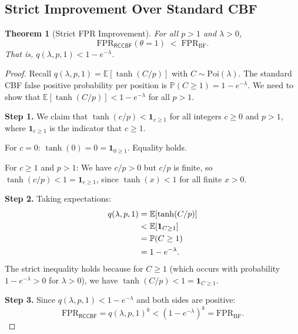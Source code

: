\documentclass[11pt,a4paper]{article}
\newtheorem{theorem}{Theorem}[section]
\newcommand{\RCCBF}{\textsf{RCCBF}}
\newcommand{\FPR}{\mathrm{FPR}}
\newcommand{\Poi}{\mathrm{Poi}}
\newcommand{\E}{\mathbb{E}}
\newcommand{\Prob}{\mathbb{P}}
\begin{document}
\subsection{Strict Improvement Over Standard CBF}\label{ssec:fpr-strict}

\begin{theorem}[Strict FPR Improvement]\label{thm:fpr-strict}
For all $p > 1$ and $\lambda > 0$,
\begin{equation}\label{eq:fpr-strict}
  \FPR_{\RCCBF}(\theta = 1) \;<\; \FPR_{\mathrm{BF}}.
\end{equation}
That is, $q(\lambda, p, 1) < 1 - e^{-\lambda}$.
\end{theorem}

\begin{proof}
Recall $q(\lambda, p, 1) = \E[\tanh(C/p)]$ with $C \sim \Poi(\lambda)$.
The standard CBF false positive probability per position is
$\Prob(C \ge 1) = 1 - e^{-\lambda}$.  We need to show that
$\E[\tanh(C/p)] < 1 - e^{-\lambda}$ for all $p > 1$.

\medskip\noindent\textbf{Step 1.}
We claim that $\tanh(c/p) < \mathbf{1}_{c \ge 1}$ for all integers
$c \ge 0$ and $p > 1$, where $\mathbf{1}_{c \ge 1}$ is the indicator that
$c \ge 1$.

For $c = 0$: $\tanh(0) = 0 = \mathbf{1}_{0 \ge 1}$.  Equality holds.

For $c \ge 1$ and $p > 1$: We have $c/p > 0$ but $c/p$ is finite, so
$\tanh(c/p) < 1 = \mathbf{1}_{c \ge 1}$, since $\tanh(x) < 1$ for all
finite $x > 0$.

\medskip\noindent\textbf{Step 2.}
Taking expectations:
\begin{align}
  q(\lambda, p, 1)
  &= \E[\tanh(C/p)] \notag \\
  &< \E[\mathbf{1}_{C \ge 1}] \notag \\
  &= \Prob(C \ge 1) \notag \\
  &= 1 - e^{-\lambda}.
  \label{eq:strict-ineq}
\end{align}
The strict inequality holds because for $C \ge 1$ (which occurs with
probability $1 - e^{-\lambda} > 0$ for $\lambda > 0$), we have
$\tanh(C/p) < 1 = \mathbf{1}_{C \ge 1}$.

\medskip\noindent\textbf{Step 3.}
Since $q(\lambda, p, 1) < 1 - e^{-\lambda}$ and both sides are positive:
\begin{equation}\label{eq:fpr-strict-final}
  \FPR_{\RCCBF}
  = q(\lambda, p, 1)^k
  < (1 - e^{-\lambda})^k
  = \FPR_{\mathrm{BF}}.
\end{equation}
\end{proof}
\end{document}
